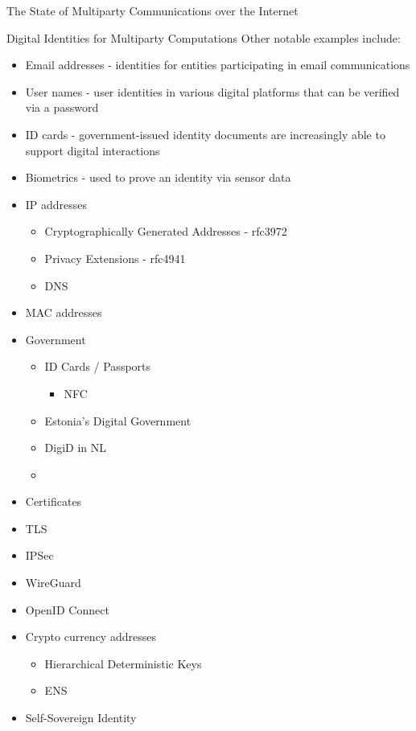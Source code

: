 \begin{frame}[fragile]{The State of Multiparty Communications over the
Internet}
\begin{block}{Digital Identities for Multiparty Computations}
Other notable examples include:

\begin{itemize}
\tightlist
\item
  Email addresses - identities for entities participating in email
  communications
\item
  User names - user identities in various digital platforms that can be
  verified via a password
\item
  ID cards - government-issued identity documents are increasingly able
  to support digital interactions
\item
  Biometrics - used to prove an identity via sensor data
\end{itemize}

\begin{itemize}
\tightlist
\item
  IP addresses

  \begin{itemize}
  \tightlist
  \item
    Cryptographically Generated Addresses - rfc3972
  \item
    Privacy Extensions - rfc4941
  \item
    DNS
  \end{itemize}
\item
  MAC addresses
\item
  Government

  \begin{itemize}
  \tightlist
  \item
    ID Cards / Passports

    \begin{itemize}
    \tightlist
    \item
      NFC
    \end{itemize}
  \item
    Estonia's Digital Government
  \item
    DigiD in NL
  \item
  \end{itemize}
\item
  Certificates
\item
  TLS
\item
  IPSec
\item
  WireGuard
\item
  OpenID Connect
\item
  Crypto currency addresses

  \begin{itemize}
  \tightlist
  \item
    Hierarchical Deterministic Keys
  \item
    ENS
  \end{itemize}
\item
  Self-Sovereign Identity


\end{itemize}
\end{block}
\end{frame}
